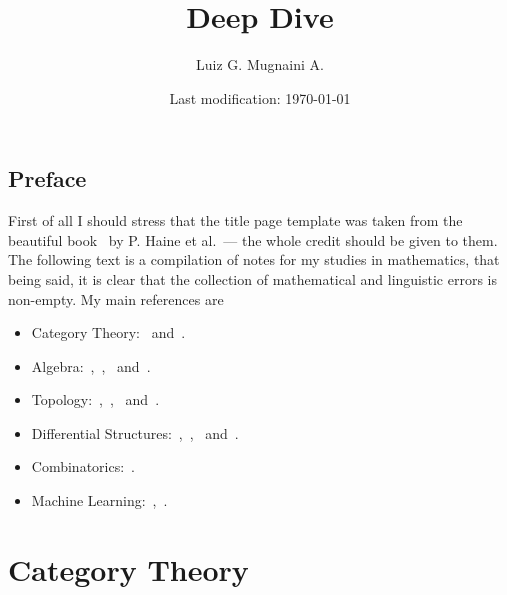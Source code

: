 

\newcommand{\onlyinsubfile}[1]{#1}
\newcommand{\notinsubfile}[1]{}

\author{Luiz G. Mugnaini A.}
\date{Last modification: \today}
\title{Deep Dive}



\renewcommand{\onlyinsubfile}[1]{}
\renewcommand{\notinsubfile}[1]{#1}

\frontmatter


\maketitle

\tableofcontents
\listoftodos

\pagestyle{plain}

\chapter{Preface}

First of all I should stress that the title page template was taken from the
beautiful book~\cite{Haine21DiffCoho} by P. Haine et al.~--- the whole credit
should be given to them. The following text is a compilation of notes for my
studies in mathematics, that being said, it is clear that the collection of
mathematical and linguistic errors is non-empty. My main references are
\begin{itemize}\setlength\itemsep{0em}
\item Category Theory:~\cite{Rie16} and~\cite{Shap06}.
\item Algebra:~\cite{Yu89},~\cite{Kim20},~\cite{Aluf09} and~\cite{Lang93}.
\item Topology:~\cite{Lee11},~\cite{Tai20},~\cite{Mun00} and~\cite{Eng89}.
\item Differential Structures:~\cite{Zor15},~\cite{Zor16},~\cite{Rud76}
  and~\cite{Jost06}.
\item Combinatorics:~\cite{Die16}.
\item Machine Learning:~\cite{Shai14},~\cite{Bishop06}.
\end{itemize}

\mainmatter


\part{Category Theory}


